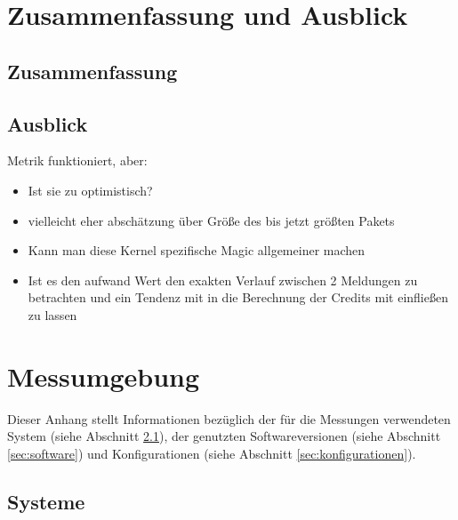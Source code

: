 \documentclass[a4paper, 12pt, BCOR10mm, DIV12, toc=bibliography, toc=listof, german]{scrbook}
\begin{document}


	\chapter{Zusammenfassung und Ausblick} %
	\label{cha:zusammenfassung}

		\section{Zusammenfassung} %
		\label{sec:zusammenfassung}
			

		\section{Ausblick} %
		\label{sec:ausblick}

		Metrik funktioniert, aber:
		\begin{itemize}
			\item Ist sie zu optimistisch?
			\item vielleicht eher abschätzung über Größe des bis jetzt größten Pakets
			\item Kann man diese Kernel spezifische Magic allgemeiner machen
			\item Ist es den aufwand Wert den exakten Verlauf zwischen 2 Meldungen zu betrachten und ein
				Tendenz mit in die Berechnung der Credits mit einfließen zu lassen
		\end{itemize}
		



	\appendix

	\chapter{Messumgebung} %
	\label{cha:messumgebung}

	Dieser Anhang stellt Informationen bezüglich der für die Messungen verwendeten System (siehe
	Abschnitt \ref{sec:Systeme}),
	der genutzten Softwareversionen (siehe Abschnitt \ref{sec:software}) und Konfigurationen
	(siehe Abschnitt \ref{sec:konfigurationen}).

		\section{Systeme} %
		\label{sec:Systeme}
\end{document}
